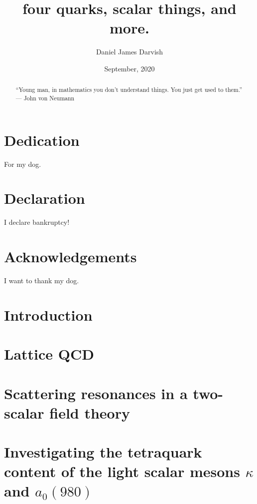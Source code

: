 \documentclass[12pt]{report}
\title{four quarks, scalar things, and more.}
\author{Daniel James Darvish}
\date{September, 2020}
\begin{document}
\onehalfspace
\maketitle
\begin{abstract}
``Young man, in mathematics you don't understand things. You just get used to them.'' --- John von Neumann
\end{abstract}

\chapter*{Dedication}
For my dog.
 
\chapter*{Declaration}
I declare bankruptcy! 
 
\chapter*{Acknowledgements}
I want to thank my dog.
 
\tableofcontents

\chapter{Introduction}


\chapter{Lattice QCD}


\chapter{Scattering resonances in a two-scalar field theory}


\chapter{Investigating the tetraquark content of the light scalar mesons $\kappa$ and $a_0(980)$}


\end{document}
